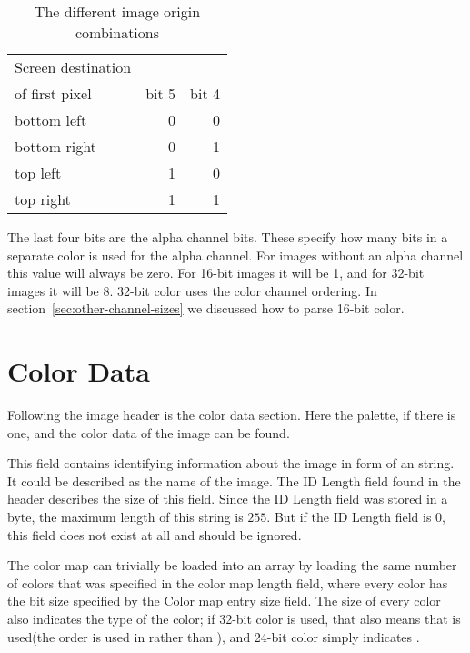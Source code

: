 \begin{table}
  \centering
  \begin{tabular}{lrr}
    \toprule
    Screen destination \\ of first pixel & bit 5 & bit 4 \\
    \midrule
    bottom left & 0 & 0 \\
    bottom right & 0 & 1 \\
    top left & 1 & 0 \\
    top right & 1 & 1 \\
    \bottomrule
  \end{tabular}
  \caption{The different image origin combinations}
  \label{tab:image-origin}
\end{table}

The last four bits are the alpha channel bits. These specify how many
bits in a separate color is used for the alpha channel. For images
without an alpha channel this value will always be zero. For 16-bit
images it will be 1, and for 32-bit images it will be 8. 32-bit color
uses the \argb color channel ordering. In section~\ref{sec:other-channel-sizes} we discussed how to parse 16-bit color.

\section{Color Data}
\label{sec:color-data}

Following the image header is the color data section. Here the
palette, if there is one, and the color data of the image can be
found.


This field contains identifying information about the image in form of
an \ascii string. It could be described as the name of the image. The
ID Length field found in the header describes the size of this
field. Since the ID Length field was stored in a byte, the maximum
length of this string is $255$. But if the ID Length field is 0, this
field does not exist at all and should be ignored.


The color map can trivially be loaded into an array by loading the
same number of colors that was specified in the color map length
field, where every color has the bit size specified by the Color map
entry size field. The size of every color also indicates the type of
the color; if 32-bit color is used, that also means that \argb is
used(the \argb order is used in \tga rather than \rgba), and 24-bit
color simply indicates \rgb.


